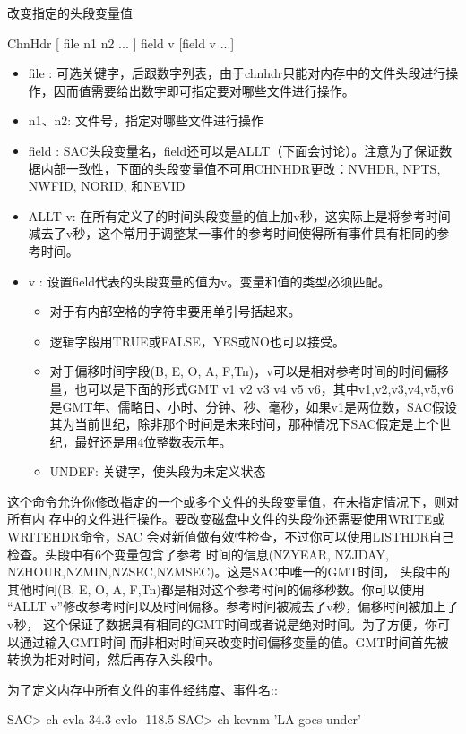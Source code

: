 \label{cmd:chnhdr}

改变指定的头段变量值

ChnHdr [ file n1 n2 ... ] field v [field v ...]

\begin{itemize}
\item file : 可选关键字，后跟数字列表，由于chnhdr只能对内存中的文件头段进行操作，因而值需要给出数字即可指定要对哪些文件进行操作。
\item n1、n2: 文件号，指定对哪些文件进行操作
\item field : SAC头段变量名，field还可以是ALLT（下面会讨论）。注意为了保证数据内部一致性，下面的头段变量值不可用CHNHDR更改：NVHDR, NPTS, NWFID, NORID, 和NEVID
\item ALLT v: 在所有定义了的时间头段变量的值上加v秒，这实际上是将参考时间减去了v秒，这个常用于调整某一事件的参考时间使得所有事件具有相同的参考时间。
\item v : 设置field代表的头段变量的值为v。变量和值的类型必须匹配。
	\begin{itemize}
	\item 对于有内部空格的字符串要用单引号括起来。
	\item 逻辑字段用TRUE或FALSE，YES或NO也可以接受。
	\item 对于偏移时间字段(B, E, O, A, F,Tn)，v可以是相对参考时间的时间偏移量，也可以是下面的形式GMT v1 v2 v3 v4 v5 v6，其中v1,v2,v3,v4,v5,v6是GMT年、儒略日、小时、分钟、秒、毫秒，如果v1是两位数，SAC假设其为当前世纪，除非那个时间是未来时间，那种情况下SAC假定是上个世纪，最好还是用4位整数表示年。
	\item UNDEF: 关键字，使头段为未定义状态
	\end{itemize}
\end{itemize}

这个命令允许你修改指定的一个或多个文件的头段变量值，在未指定情况下，则对所有内
存中的文件进行操作。要改变磁盘中文件的头段你还需要使用WRITE或WRITEHDR命令，SAC
会对新值做有效性检查，不过你可以使用LISTHDR自己检查。头段中有6个变量包含了参考
时间的信息(NZYEAR, NZJDAY, NZHOUR,NZMIN,NZSEC,NZMSEC)。这是SAC中唯一的GMT时间，
头段中的其他时间(B, E, O, A, F,Tn)都是相对这个参考时间的偏移秒数。你可以使用
``ALLT v''修改参考时间以及时间偏移。参考时间被减去了v秒，偏移时间被加上了v秒，
这个保证了数据具有相同的GMT时间或者说是绝对时间。为了方便，你可以通过输入GMT时间
而非相对时间来改变时间偏移变量的值。GMT时间首先被转换为相对时间，然后再存入头段中。

为了定义内存中所有文件的事件经纬度、事件名::
\begin{SACCode}
SAC> ch evla 34.3 evlo -118.5
SAC> ch kevnm 'LA goes under'
\end{SACCode}

